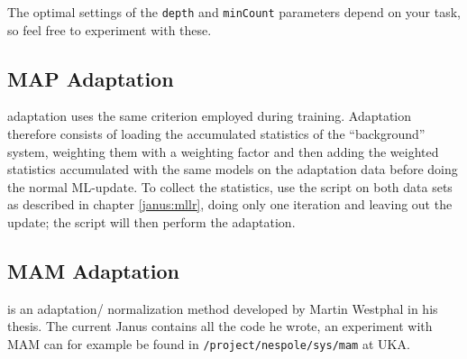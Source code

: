 The optimal settings    of the \texttt{depth}  and   \texttt{minCount}
parameters depend on your task, so feel free to experiment with these.

\subsection{MAP Adaptation}  \label{janus:map}


 adaptation uses the  same  criterion employed
during training.   Adaptation   therefore  consists  of    loading the
accumulated statistics   of the ``background''  system, weighting them
with   a weighting factor   and  then adding  the weighted  statistics
accumulated with the  same models on  the adaptation data before doing
the  normal  ML-update.    To    collect the  statistics,   use    the
 script on    both data sets as   described  in
chapter \ref{janus:mllr}, doing only one iteration and leaving out the
update;  the  script      will then   perform the
adaptation.

\subsection{MAM Adaptation} \label{janus:mam}


  is   an  adaptation/ normalization  method  developed by
Martin Westphal in his thesis. The current Janus contains all the code
he wrote,   an   experiment with MAM    can for  example be   found in
\texttt{/project/nespole/sys/mam} at UKA.

